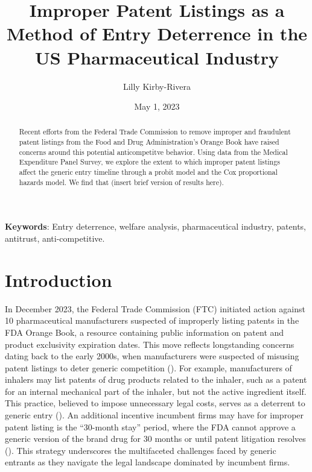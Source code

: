 \documentclass[12pt,a4paper]{article}
\title{Improper Patent Listings as a Method of Entry Deterrence in the US Pharmaceutical Industry}
\author[1]{Lilly Kirby-Rivera}
\date{May 1, 2023}  %
\begin{document}
\maketitle

\begin{abstract}
Recent efforts from the Federal Trade Commission to remove improper and fraudulent patent listings from the Food and Drug Administration's Orange Book have raised concerns around this potential anticompetitve behavior. Using data from the Medical Expenditure Panel Survey, we explore the extent to which improper patent listings affect the generic entry timeline through a probit model and the Cox proportional hazards model. We find that (insert brief version of results here). %
\end{abstract}

\textbf{Keywords}: Entry deterrence, welfare analysis, pharmaceutical industry, patents, antitrust, anti-competitive.  

\section{Introduction}
In December 2023, the Federal Trade Commission (FTC) initiated action against 10
pharmaceutical manufacturers suspected of improperly listing patents in the FDA Orange Book, a resource containing public information on patent and product exclusivity expiration dates. This move reflects longstanding concerns dating back to the early 2000s, when manufacturers were suspected of misusing patent listings to deter generic competition (\cite{ftc2002}). For example, manufacturers of inhalers may list patents of drug products related to the inhaler, such as a patent for an internal mechanical part of the inhaler, but not the active ingredient itself. This practice, believed to impose unnecessary legal costs, serves as a deterrent to generic entry (\cite{fda2020}). An additional incentive incumbent firms may have for improper patent listing is the “30-month stay” period, where the FDA cannot approve a generic version of the brand drug for 30 months or until patent litigation resolves (\cite{kannapan2021}). This strategy underscores the multifaceted challenges faced by generic entrants as they navigate the legal landscape dominated by incumbent firms. 
\end{document}
